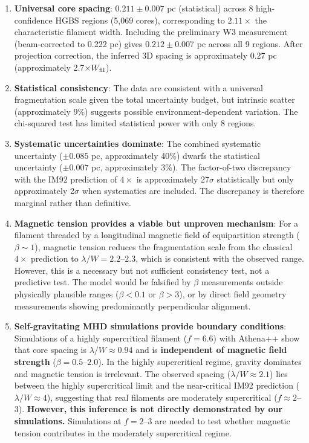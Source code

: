 \documentclass[11pt,a4paper]{article}
\begin{document}
\begin{enumerate}
    \item \textbf{Universal core spacing}: $0.211 \pm 0.007$ pc (statistical) across 8 high-confidence HGBS regions (5,069 cores), corresponding to $2.11\times$ the characteristic filament width. Including the preliminary W3 measurement (beam-corrected to 0.222 pc) gives $0.212 \pm 0.007$ pc across all 9 regions. After projection correction, the inferred 3D spacing is approximately 0.27 pc (approximately 2.7$\times W_{\rm fil}$).

    \item \textbf{Statistical consistency}: The data are consistent with a universal fragmentation scale given the total uncertainty budget, but intrinsic scatter (approximately 9\%) suggests possible environment-dependent variation. The chi-squared test has limited statistical power with only 8 regions.

    \item \textbf{Systematic uncertainties dominate}: The combined systematic uncertainty ($\pm0.085$ pc, approximately 40\%) dwarfs the statistical uncertainty ($\pm0.007$ pc, approximately 3\%). The factor-of-two discrepancy with the IM92 prediction of $4\times$ is approximately 27$\sigma$ statistically but only approximately 2$\sigma$ when systematics are included. The discrepancy is therefore marginal rather than definitive.

    \item \textbf{Magnetic tension provides a viable but unproven mechanism}: For a filament threaded by a longitudinal magnetic field of equipartition strength ($\beta \sim 1$), magnetic tension reduces the fragmentation scale from the classical $4\times$ prediction to $\lambda/W = 2.2$--$2.3$, which is consistent with the observed range. However, this is a necessary but not sufficient consistency test, not a predictive test. The model would be falsified by $\beta$ measurements outside physically plausible ranges ($\beta < 0.1$ or $\beta > 3$), or by direct field geometry measurements showing predominantly perpendicular alignment.

    \item \textbf{Self-gravitating MHD simulations provide boundary conditions}: Simulations of a highly supercritical filament ($f = 6.6$) with Athena++ show that core spacing is $\lambda/W \approx 0.94$ and is \textbf{independent of magnetic field strength} ($\beta = 0.5$--$2.0$). In the highly supercritical regime, gravity dominates and magnetic tension is irrelevant. The observed spacing ($\lambda/W \approx 2.1$) lies between the highly supercritical limit and the near-critical IM92 prediction ($\lambda/W \approx 4$), suggesting that real filaments are moderately supercritical ($f \approx 2$--$3$). \textbf{However, this inference is not directly demonstrated by our simulations.} Simulations at $f = 2$--$3$ are needed to test whether magnetic tension contributes in the moderately supercritical regime.


\end{enumerate}
\end{document}
